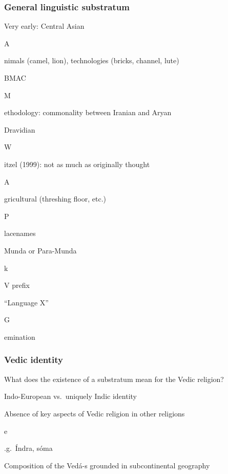 \documentclass[pdf]{beamer}
\newcommand{\Subitem}[1]{{\setlength\itemindent{12pt} \item[-] #1}}
\begin{document}
\begin{frame} \frametitle{General linguistic substratum}
\begin{itemize}
	\item Very early: Central Asian
	\Subitem Animals (camel, lion), technologies (bricks, channel, lute)
	\item BMAC
	\Subitem Methodology: commonality between Iranian and Aryan
	\item Dravidian
	\Subitem Witzel (1999): not as much as originally thought
	\Subitem Agricultural (threshing floor, etc.)
	\Subitem Placenames
	\item Munda or Para-Munda
	\Subitem kV prefix
	\item ``Language X''
	\Subitem Gemination
\end{itemize}
\end{frame}

\begin{frame} \frametitle{Vedic identity}
\begin{itemize}
	\item What does the existence of a substratum mean for the Vedic religion?
	\item Indo-European vs.~uniquely Indic identity
	\item Absence of key aspects of Vedic religion in other religions
	\Subitem e.g.~Índra, sóma
	\item Composition of the Vedá-s grounded in subcontinental geography
\end{itemize}
\end{frame}

\end{document}
